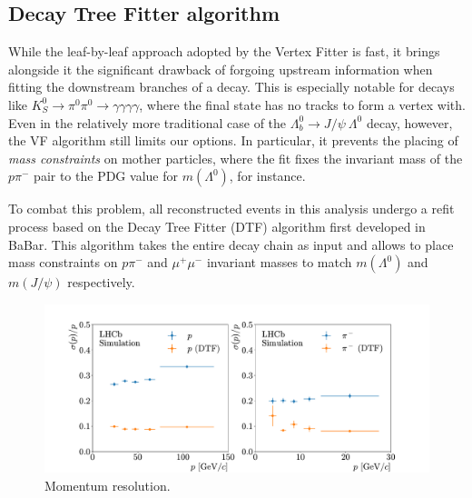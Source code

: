 \subsection{Decay Tree Fitter algorithm}
While the leaf-by-leaf approach adopted by the Vertex Fitter is fast, it brings alongside it the significant drawback of forgoing upstream information when fitting the downstream branches of a decay.
This is especially notable for decays like $K_S^0 \rightarrow \pi^0\pi^0 \rightarrow \gamma\gamma\gamma\gamma$, where the final state has no tracks to form a vertex with.
Even in the relatively more traditional case of the $\Lambda_b^0 \rightarrow J/\psi~\Lambda^0$ decay, however, the VF algorithm still limits our options.
In particular, it prevents the placing of \textit{mass constraints} on mother particles, where the fit fixes the invariant mass of the $p\pi^-$ pair to the PDG value for $m(\Lambda^0)$, for instance.

To combat this problem, all reconstructed events in this analysis undergo a refit process based on the Decay Tree Fitter (DTF) algorithm \cite{Hulsbergen:2005pu} first developed in BaBar.
This algorithm takes the entire decay chain as input and allows to place mass constraints on $p\pi^-$ and $\mu^+\mu^-$ invariant masses to match $m(\Lambda^0)$ and $m(J/\psi)$ respectively.


\begin{figure}[t]
	\centering
	\includegraphics[width=\textwidth]{graphics/04-event_selection/paper_momentum_resolutions.pdf}
	\caption[Momentum resolution.]{Momentum resolution.}
	\label{fig:paper_momentum_resolutions}
\end{figure}

